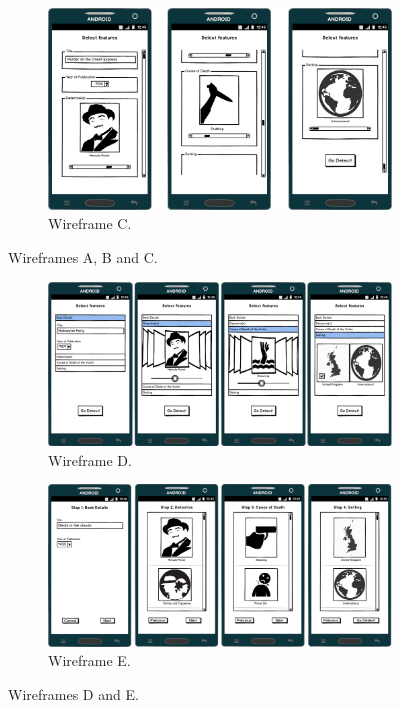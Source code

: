 \documentclass{mproj}
\begin{document}
\begin{figure}
	\begin{subfigure}{\textwidth}
		\includegraphics[width=\textwidth]{images/single_list}
		\caption{Wireframe C.}
		\label{fig:wireframeC}		
	\end{subfigure}
	\caption{Wireframes A, B and C.}
\end{figure}

\begin{figure}
	\centering
	
	\begin{subfigure}{\textwidth}
		\includegraphics[width=\textwidth]{images/single_accordion}
		\caption{Wireframe D.}
		\label{fig:wireframeD}		
	\end{subfigure}		
	
	\begin{subfigure}{\textwidth}
		\includegraphics[width=\textwidth]{images/multiple_list}
		\caption{Wireframe E.}
		\label{fig:wireframeE}		
	\end{subfigure}			
	\caption{Wireframes D and E.}
\end{figure}
	
\end{document}

